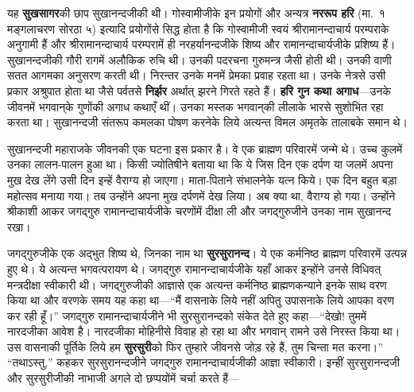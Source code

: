 \begin{sloppypar}\justifying{}
यह \textbf{सुखसागर}की छाप सुखानन्दजीकी थी। गोस्वामीजीके इन प्रयोगों और अन्यत्र \textbf{नररूप हरि} (मा.~१ मङ्गलाचरण सोरठा ५) इत्यादि प्रयोगोंसे सिद्ध होता है कि गोस्वामीजी स्वयं श्रीरामानन्दाचार्य परम्पराके अनुगामी हैं और श्रीरामानन्दाचार्य परम्परामें ही नरहर्यानन्दजीके शिष्य और रामानन्दाचार्यजीके प्रशिष्य हैं। सुखानन्दजीकी गौरी रागमें अलौकिक रुचि थी। उनकी पदरचना गुरुमन्त्र जैसी होती थी। उनकी वाणी सतत आगमका अनुसरण करती थी। निरन्तर उनके मनमें प्रेमका प्रवाह रहता था। उनके नेत्रसे उसी प्रकार अश्रुपात होता था जैसे पर्वतसे \textbf{निर्झर} अर्थात् झरने गिरते रहते हैं। \textbf{हरि गुन कथा अगाध}—उनके जीवनमें भगवान्‌के गुणोंकी अगाध कथाएँ थीं। उनका मस्तक भगवान्‌की लीलाके भारसे सुशोभित रहा करता था। सुखानन्दजी संतरूप कमलका पोषण करनेके लिये अत्यन्त विमल अमृतके तालाबके समान थे।
\end{sloppypar}
\begin{sloppypar}\justifying{}
सुखानन्दजी महाराजके जीवनकी एक घटना इस प्रकार है। वे एक ब्राह्मण परिवारमें जन्मे थे। उच्च कुलमें उनका लालन-पालन हुआ था। किसी ज्योतिषीने बताया था कि ये जिस दिन एक दर्पण या जलमें अपना मुख देख लेंगे उसी दिन इन्हें वैराग्य हो जाएगा। माता-पिताने संभालनेके यत्न किये। एक दिन बहुत बड़ा महोत्सव मनाया गया। तब उन्होंने अपना मुख दर्पणमें देख लिया। अब क्या था, वैराग्य हो गया। उन्होंने श्रीकाशी आकर जगद्गुरु रामानन्दाचार्यजीके चरणोंमें दीक्षा ली और जगद्गुरुजीने उनका नाम सुखानन्द रखा।
\end{sloppypar}
\begin{sloppypar}\justifying{}
जगद्गुरुजीके एक अद्भुत शिष्य थे, जिनका नाम था \textbf{सुरसुरानन्द}। ये एक कर्मनिष्ठ ब्राह्मण परिवारमें उत्पन्न हुए थे। ये अत्यन्त भगवत्परायण थे। जगद्गुरु रामानन्दाचार्यजीके यहाँ आकर इन्होंने उनसे विधिवत् मन्त्रदीक्षा स्वीकारी थी। जगद्गुरुजीकी आज्ञासे एक अत्यन्त कर्मनिष्ठ ब्राह्मण\-कन्याने इनके साथ वरण किया था और वरणके समय यह कहा था—“मैं वासनाके लिये नहीं अपितु उपासनाके लिये आपका वरण कर रही हूँ।” जगद्गुरु रामानन्दाचार्यजीने भी सुरसुरानन्दको संकेत देते हुए कहा—“देखो! तुममें नारदजीका आवेश है। नारदजीका मोहिनीसे विवाह हो रहा था और भगवान् रामने उसे निरस्त किया था। उस वासनाकी पूर्तिके लिये हम \textbf{सुरसुरी}को फिर तुम्हारे जीवनसे जोड़ रहे हैं, तुम चिन्ता मत करना।” “तथाऽस्तु,” कहकर सुरसुरानन्दजीने जगद्गुरु रामानन्दाचार्यजीकी आज्ञा स्वीकारी। इन्हीं सुरसुरानन्दजी और सुरसुरीजीकी नाभाजी अगले दो छप्पयोंमें चर्चा करते हैं—
\end{sloppypar}


